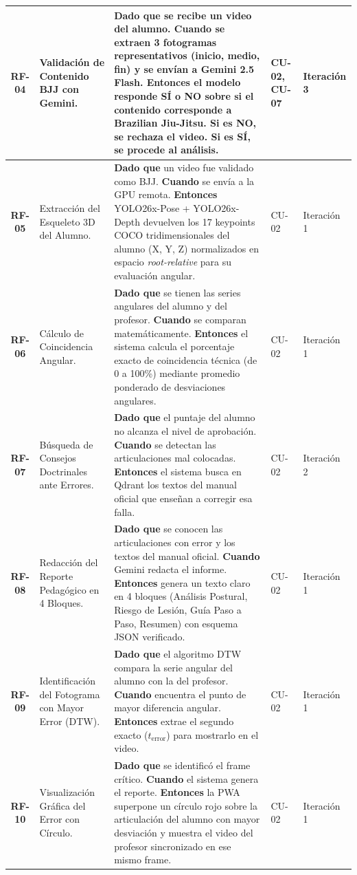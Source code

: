 \documentclass[12pt,letterpaper]{article}
\begin{document}
\begin{xltabular}{\textwidth}{|c|>{\raggedright\arraybackslash}p{0.22\textwidth}|>{\raggedright\arraybackslash}X|>{\centering\arraybackslash}p{0.12\textwidth}|>{\centering\arraybackslash}p{0.1\textwidth}|}
    \textbf{RF-04} & Validación de Contenido BJJ con Gemini. & \textbf{Dado que} se recibe un video del alumno. \textbf{Cuando} se extraen 3 fotogramas representativos (inicio, medio, fin) y se envían a Gemini 2.5 Flash. \textbf{Entonces} el modelo responde SÍ o NO sobre si el contenido corresponde a Brazilian Jiu-Jitsu. Si es NO, se rechaza el video. Si es SÍ, se procede al análisis. & CU-02, CU-07 & Iteración 3 \\ \hline
    \textbf{RF-05} & Extracción del Esqueleto 3D del Alumno. & \textbf{Dado que} un video fue validado como BJJ. \textbf{Cuando} se envía a la GPU remota. \textbf{Entonces} YOLO26x-Pose + YOLO26x-Depth devuelven los 17 keypoints COCO tridimensionales del alumno (X, Y, Z) normalizados en espacio \textit{root-relative} para su evaluación angular. & CU-02 & Iteración 1 \\ \hline
    \textbf{RF-06} & Cálculo de Coincidencia Angular. & \textbf{Dado que} se tienen las series angulares del alumno y del profesor. \textbf{Cuando} se comparan matemáticamente. \textbf{Entonces} el sistema calcula el porcentaje exacto de coincidencia técnica (de 0 a 100\%) mediante promedio ponderado de desviaciones angulares. & CU-02 & Iteración 1 \\ \hline
    \textbf{RF-07} & Búsqueda de Consejos Doctrinales ante Errores. & \textbf{Dado que} el puntaje del alumno no alcanza el nivel de aprobación. \textbf{Cuando} se detectan las articulaciones mal colocadas. \textbf{Entonces} el sistema busca en Qdrant los textos del manual oficial que enseñan a corregir esa falla. & CU-02 & Iteración 2 \\ \hline
    \textbf{RF-08} & Redacción del Reporte Pedagógico en 4 Bloques. & \textbf{Dado que} se conocen las articulaciones con error y los textos del manual oficial. \textbf{Cuando} Gemini redacta el informe. \textbf{Entonces} genera un texto claro en 4 bloques (Análisis Postural, Riesgo de Lesión, Guía Paso a Paso, Resumen) con esquema JSON verificado. & CU-02 & Iteración 1 \\ \hline
    \textbf{RF-09} & Identificación del Fotograma con Mayor Error (DTW). & \textbf{Dado que} el algoritmo DTW compara la serie angular del alumno con la del profesor. \textbf{Cuando} encuentra el punto de mayor diferencia angular. \textbf{Entonces} extrae el segundo exacto ($t_{\text{error}}$) para mostrarlo en el video. & CU-02 & Iteración 1 \\ \hline
    \textbf{RF-10} & Visualización Gráfica del Error con Círculo. & \textbf{Dado que} se identificó el frame crítico. \textbf{Cuando} el sistema genera el reporte. \textbf{Entonces} la PWA superpone un círculo rojo sobre la articulación del alumno con mayor desviación y muestra el video del profesor sincronizado en ese mismo frame. & CU-02 & Iteración 1 \\ \hline

\end{xltabular}
\end{document}
